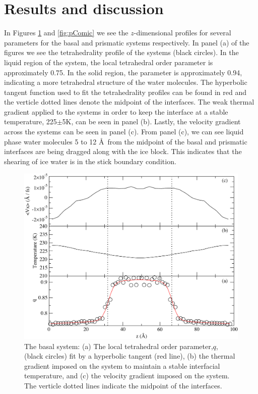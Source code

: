\documentclass[journal = jpccck, manuscript = article]{achemso}
\begin{document}
\section{Results and discussion}


In Figures \ref{fig:bComic} and \ref{fig:pComic} we see the $z$-dimensional profiles for several parameters for the basal and prismatic systems respectively. In panel (a) of the figures we see the tetrahedrality profile of the systems (black circles). In the liquid region of the system, the local tetrahedral order parameter is approximately 0.75. In the solid region, the parameter is approximately 0.94, indicating a more tetrahedral structure of the water molecules. The hyperbolic tangent function used to fit the tetrahedrality profiles can be found in red and the verticle dotted lines denote the midpoint of the interfaces. The weak thermal gradient applied to the systems in order to keep the interface at a stable temperature, 225$\pm$5K, can be seen in panel (b).  Lastly, the velocity gradient across the systems can be seen in panel (c). From panel (c), we can see liquid phase water molecules 5 to 12 \AA\ from the midpoint of the basal and prismatic interfaces are being dragged along with the ice block. This indicates that the shearing of ice water is in the stick boundary condition.   

\begin{figure}
\includegraphics[width=\linewidth]{bComicStrip}
\caption{\label{fig:bComic} The basal system: (a) The local tetrahedral order parameter,$q$, (black circles) fit by a hyperbolic tangent (red line), (b) the thermal gradient imposed on the system to maintain a stable interfacial temperature, and (c) the velocity gradient imposed on the system. The verticle dotted lines indicate the midpoint of the interfaces.}
\end{figure}
\end{document}
